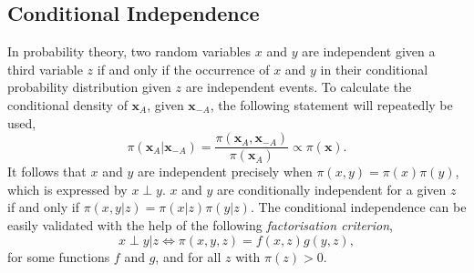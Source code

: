 \documentclass[12pt]{book}
\begin{document}
\subsection{Conditional Independence}
In probability theory, two random variables $x$ and $y$ are independent given a third variable $z$ if and only if the occurrence of $x$ and $y$ in their conditional probability distribution given $z$ are independent events. To calculate the conditional density of $\pmb{x}_A$, given $\pmb{x}_{-A}$, the following statement will repeatedly be used,
\begin{equation}
    \pi\left(\pmb{x}_A|\pmb{x}_{-A}\right)=\frac{\pi\left(\pmb{x}_A,\pmb{x}_{-A}\right)}{\pi\left(\pmb{x}_{A}\right)}\propto \pi\left(\pmb{x}\right).
\end{equation}
It follows that $x$ and $y$ are independent precisely when $\pi\left(x,y\right)=\pi\left(x\right)\pi\left(y\right)$, which is expressed by $x\perp y$. $x$ and $y$ are conditionally independent for a given $z$ if and only if $\pi\left(x,y|z\right)=\pi\left(x|z\right)\pi\left(y|z\right)$. The conditional independence can be easily validated with the help of the following \textit{factorisation criterion},
\begin{equation}
    x\perp y|z\Longleftrightarrow \pi\left(x,y,z\right)=f\left(x,z\right)g\left(y,z\right),
\end{equation}
for some functions $f$ and $g$, and for all $z$ with $\pi\left(z\right) >0$\autocite[Cf.][]{rue2005gaussian}.
\end{document}
